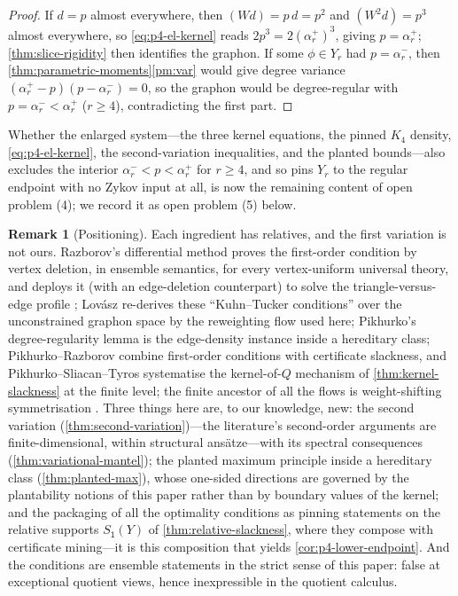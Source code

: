 \documentclass[11pt]{article}
\theoremstyle{definition}
\newtheorem{remark}[remark]{Remark}
\newcommand{\vtype}{\mathsf{1}}
\begin{document}
\begin{proof}
If $d=p$ almost everywhere, then $(Wd)=p\,d=p^2$ and $(W^2d)=p^3$ almost everywhere,
so \eqref{eq:p4-el-kernel} reads $2p^3=2(\alpha_r^+)^3$, giving $p=\alpha_r^+$;
\cref{thm:slice-rigidity} then identifies the graphon.  If some $\phi\in Y_r$ had
$p=\alpha_r^-$, then \cref{thm:parametric-moments}\ref{pm:var} would give degree
variance $(\alpha_r^+-p)(p-\alpha_r^-)=0$, so the graphon would be degree-regular with
$p=\alpha_r^-<\alpha_r^+$ ($r\ge4$), contradicting the first part.
\end{proof}

Whether the enlarged system---the three kernel equations, the pinned $K_4$ density,
\eqref{eq:p4-el-kernel}, the second-variation inequalities, and the planted
bounds---also excludes the interior $\alpha_r^-<p<\alpha_r^+$ for
$r\ge4$, and so pins $Y_r$ to the regular endpoint with no Zykov input at all, is now
the remaining content of open problem (4); we record it as open problem (5) below.

\begin{remark}[Positioning]\label{rem:variational-positioning}
Each ingredient has relatives, and the first variation is not ours.  Razborov's
differential method \cite[\S4.3]{Razborov2007} proves the first-order condition by
vertex deletion, in ensemble semantics, for every vertex-uniform universal theory, and
deploys it (with an edge-deletion counterpart) to solve the triangle-versus-edge
profile \cite{Razborov2008}; Lov\'asz \cite[\S16.2]{Lovasz2012book} re-derives these
``Kuhn--Tucker conditions'' over the unconstrained graphon space by the reweighting
flow used here; Pikhurko's degree-regularity lemma \cite[Lemma 22]{Pikhurko2010} is
the edge-density instance inside a hereditary class; Pikhurko--Razborov
\cite{PikhurkoRazborov2017} combine first-order conditions with certificate slackness,
and Pikhurko--Sliacan--Tyros \cite{PikhurkoSliacanTyros2019} systematise the
kernel-of-$Q$ mechanism of \cref{thm:kernel-slackness} at the finite level; the finite
ancestor of all the flows is weight-shifting symmetrisation
\cite{Zykov1949,MotzkinStraus}.  Three things here are, to our knowledge, new: the
second variation (\cref{thm:second-variation})---the literature's second-order
arguments are finite-dimensional, within structural ans\"atze---with its spectral
consequences (\cref{thm:variational-mantel}); the planted maximum principle inside a
hereditary class (\cref{thm:planted-max}), whose one-sided directions are governed by
the plantability notions of this paper rather than by boundary values of the kernel;
and the packaging of all the optimality conditions as pinning statements on the
relative supports $S_\vtype(Y)$ of \cref{thm:relative-slackness}, where they compose
with certificate mining---it is this composition that yields
\cref{cor:p4-lower-endpoint}.  And the conditions are ensemble statements in the
strict sense of this paper: false at exceptional quotient views, hence inexpressible
in the quotient calculus.
\end{remark}
\end{document}
